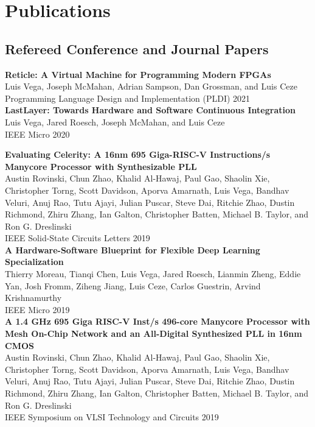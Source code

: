 \documentclass[10pt]{article}
\begin{document}
\section*{Publications}

\subsection*{Refereed Conference and Journal Papers}

\textbf{%
  Reticle: A Virtual Machine for Programming Modern FPGAs
} \\
Luis Vega, Joseph McMahan, Adrian Sampson, Dan Grossman, and Luis Ceze \\
Programming Language Design and Implementation (PLDI) 2021 \\

\textbf{%
  LastLayer: Towards Hardware and Software Continuous Integration
} \\
Luis Vega, Jared Roesch, Joseph McMahan, and Luis Ceze \\
IEEE Micro 2020 \\

\newpage

\textbf{%
  Evaluating Celerity: A 16nm 695 Giga-RISC-V Instructions/s Manycore Processor with Synthesizable PLL
} \\
Austin Rovinski, Chun Zhao, Khalid Al-Hawaj, Paul Gao, Shaolin Xie, Christopher Torng,
Scott Davidson, Aporva Amarnath, Luis Vega, Bandhav Veluri, Anuj Rao, Tutu Ajayi,
Julian Puscar, Steve Dai, Ritchie Zhao, Dustin Richmond, Zhiru Zhang, Ian Galton,
Christopher Batten, Michael B. Taylor, and Ron G. Dreslinski \\
IEEE Solid-State Circuits Letters 2019 \\

\textbf{%
  A Hardware-Software Blueprint for Flexible Deep Learning Specialization
} \\
Thierry Moreau, Tianqi Chen, Luis Vega, Jared Roesch, Lianmin Zheng, Eddie Yan,
Josh Fromm, Ziheng Jiang, Luis Ceze, Carlos Guestrin, Arvind Krishnamurthy \\
IEEE Micro 2019 \\
  
\textbf{%
  A 1.4 GHz 695 Giga RISC-V Inst/s 496-core Manycore Processor with Mesh On-Chip Network and an All-Digital Synthesized PLL in 16nm CMOS
} \\
Austin Rovinski, Chun Zhao, Khalid Al-Hawaj, Paul Gao, Shaolin Xie, Christopher Torng,
Scott Davidson, Aporva Amarnath, Luis Vega, Bandhav Veluri, Anuj Rao, Tutu Ajayi,
Julian Puscar, Steve Dai, Ritchie Zhao, Dustin Richmond, Zhiru Zhang, Ian Galton,
Christopher Batten, Michael B. Taylor, and Ron G. Dreslinski \\
IEEE Symposium on VLSI Technology and Circuits 2019 \\
  
\end{document}
